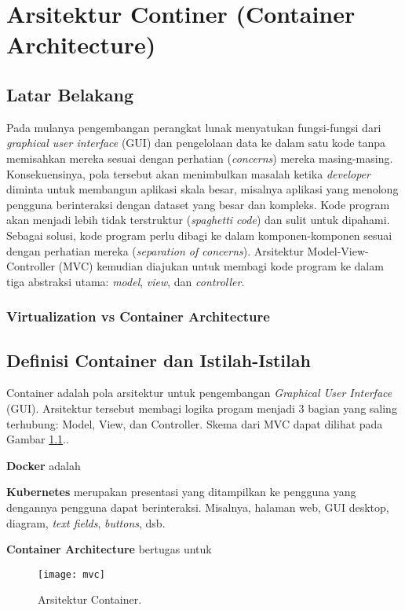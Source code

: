 \chapter{Arsitektur Continer (Container Architecture)}

\section{Latar Belakang}
Pada mulanya pengembangan perangkat lunak menyatukan fungsi-fungsi dari \textit{graphical user interface} (GUI) dan pengelolaan data ke dalam satu kode tanpa memisahkan mereka sesuai dengan perhatian (\textit{concerns}) mereka masing-masing. 
Konsekuensinya, pola tersebut akan menimbulkan masalah ketika \textit{developer} diminta untuk membangun aplikasi  skala besar,  misalnya aplikasi yang menolong pengguna berinteraksi dengan dataset yang besar dan kompleks. Kode program akan menjadi lebih tidak terstruktur (\textit{spaghetti code}) dan sulit untuk dipahami. 
Sebagai solusi, kode program perlu dibagi ke dalam komponen-komponen sesuai dengan perhatian mereka (\textit{separation of concerns}). 
Arsitektur Model-View-Controller (MVC) kemudian diajukan untuk membagi kode program ke dalam tiga abstraksi utama: \textit{model}, \textit{view}, dan \textit{controller}.
\subsection{Virtualization vs Container Architecture}

\section{Definisi Container dan Istilah-Istilah}
Container adalah pola arsitektur untuk pengembangan \textit{Graphical User Interface} (GUI). Arsitektur tersebut membagi logika progam menjadi 3 bagian yang saling terhubung: Model, View, dan Controller. Skema dari MVC dapat dilihat pada Gambar \ref{fig:mvc}..

\textbf{Docker} adalah 

\textbf{Kubernetes} merupakan presentasi yang ditampilkan ke pengguna yang dengannya pengguna dapat berinteraksi. Misalnya, halaman web, GUI desktop, diagram, \textit{text fields}, \textit{buttons}, dsb.

\textbf{Container Architecture} bertugas untuk

\begin{figure}[h]
    \centering
    \texttt{[image: mvc]}
    \caption{Arsitektur Container.}
    \label{fig:mvc}
\end{figure}


